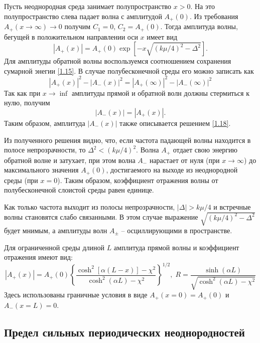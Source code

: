 Пусть неоднородная среда занимает полупространство $x>0$. На это полупространство слева падает волна с амплитудой $A_+(0)$. Из требования $A_+(x\to\infty)\to 0$ получим $C_1=0$, $C_2=A_+(0)$. Тогда амплитуда волны, бегущей в положительном направлении оси $x$ имеет вид
\begin{equation}\label{1.18}
|A_+(x)|=A_+(0)\exp\left[-x\sqrt{(k\mu/4)^2-\Delta^2}\right].
\end{equation}
Для амплитуды обратной волны воспользуемся соотношением сохранения сумарной энегии \eqref{1.15}. В случае полубесконечной среды его можно записать как
$$
\left|A_+(x)\right|^2-\left|A_-(x)\right|^2=
\left|A_+(\infty)\right|^2-\left|A_-(\infty)\right|^2
$$
Так как при $x\to\inf$ амплитуды прямой и обратной волн должны стермиться к нулю, получим
\begin{equation}\label{1.19}
\left|A_-(x)\right|=\left|A_+(x)\right|.
\end{equation}
Таким образом, амплитуда $|A_-(x)|$ также описывается решением \eqref{1.18}.

Из полученного решения видно, что, если частота падающей волны находится в полосе непрозрачности, то $\Delta^2<(k\mu/4)^2$. Волна $A_+$ отдает свою энергию обратной волне и затухает, при этом волна $A_-$ нарастает от нуля (при $x\to\infty$) до максимального значения $A_+(0)$, достигаемого на выходе из неоднородной среды (при $x=0$). Таким образом, коэффициент отражения волны от полубесконечной слоистой среды равен единице.

Как только частота выходит из полосы непрозрачности, $|\Delta|>k\mu/4$ и встречные волны становятся слабо связанными. В этом случае выражение $\sqrt{(k\mu/4)^2-\Delta^2}$ будет мнимым, а амплитуды волн $A_\pm$ -- осциллирующими в пространстве.

\begin{utv}
Для ограниченной среды длиной $L$ амплитуда прямой волны и коэффициент отражения имеют вид:
\begin{equation}\label{1.20}
\left|A_+(x)\right|=A_+(0)
\left\lbrace
\frac{\cosh^2[\alpha(L-x)]-\chi^2}{\cosh^2(\alpha L)-\chi^2}
\right\rbrace^{1/2}, \;
R=\frac{\sinh(\alpha L)}{\sqrt{\cosh^2(\alpha L)-\chi^2}}
\end{equation}
Здесь использованы граничные условия в виде $A_+(x=0)=A_+(0)$ и $A_-(x=L)=0$.
\end{utv}


\subsection{Предел сильных периодических неоднородностей}
\label{sec:hill}

